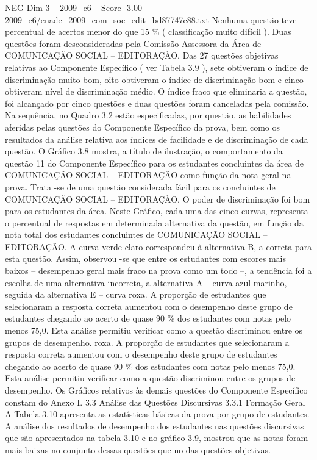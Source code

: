 \begin{textsample}{NEG Dim 3 – 2009\_c6 – Score -3.00 – 2009\_c6/enade\_2009\_com\_soc\_edit\_bd87747c88.txt}
Nenhuma questão teve percentual de acertos menor do que 15 \% ( classificação muito difícil ).
Duas questões foram desconsideradas pela Comissão Assessora da Área de COMUNICAÇÃO SOCIAL – EDITORAÇÃO.
Das 27 questões objetivas relativas ao Componente Específico ( ver Tabela 3.9 ), sete obtiveram o índice de discriminação muito bom, oito obtiveram o índice de discriminação bom e cinco obtiveram nível de discriminação médio.
O índice fraco que eliminaria a questão, foi alcançado por cinco questões e duas questões foram canceladas pela comissão.
Na sequência, no Quadro 3.2 estão especificadas, por questão, as habilidades aferidas pelas questões do Componente Específico da prova, bem como os resultados da análise relativa aos índices de facilidade e de discriminação de cada questão.
O Gráfico 3.8 mostra, a título de ilustração, o comportamento da questão 11 do Componente Específico para os estudantes concluintes da área de COMUNICAÇÃO SOCIAL – EDITORAÇÃO como função da nota geral na prova.
Trata -se de uma questão considerada fácil para os concluintes de COMUNICAÇÃO SOCIAL – EDITORAÇÃO.
O poder de discriminação foi bom para os estudantes da área.
Neste Gráfico, cada uma das cinco curvas, representa o percentual de respostas em determinada alternativa da questão, em função da nota total dos estudantes concluintes de COMUNICAÇÃO SOCIAL – EDITORAÇÃO.
A curva verde claro correspondeu à alternativa B, a correta para esta questão.
Assim, observou -se que entre os estudantes com escores mais baixos – desempenho geral mais fraco na prova como um todo –, a tendência foi a escolha de uma alternativa incorreta, a alternativa A – curva azul marinho, seguida da alternativa E – curva roxa.
A proporção de estudantes que selecionaram a resposta correta aumentou com o desempenho deste grupo de estudantes chegando ao acerto de quase 90 \% dos estudantes com notas pelo menos 75,0.
Esta análise permitiu verificar como a questão discriminou entre os grupos de desempenho. roxa.
A proporção de estudantes que selecionaram a resposta correta aumentou com o desempenho deste grupo de estudantes chegando ao acerto de quase 90 \% dos estudantes com notas pelo menos 75,0.
Esta análise permitiu verificar como a questão discriminou entre os grupos de desempenho.
Os Gráficos relativos às demais questões do Componente Específico constam do Anexo I. 3.3 Análise das Questões Discursivas 3.3.1 Formação Geral A Tabela 3.10 apresenta as estatísticas básicas da prova por grupo de estudantes.
A análise dos resultados de desempenho dos estudantes nas questões discursivas que são apresentados na tabela 3.10 e no gráfico 3.9, mostrou que as notas foram mais baixas no conjunto dessas questões que no das questões objetivas.

\end{textsample}
